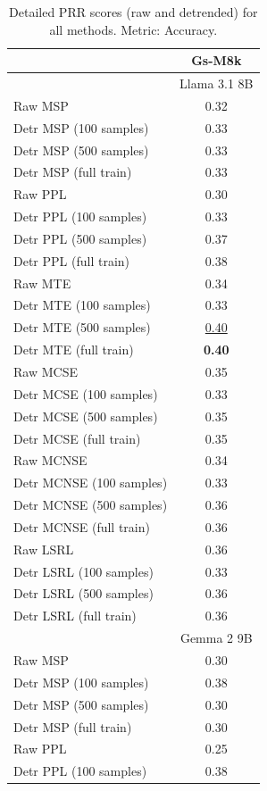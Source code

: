 \begin{table}
\footnotesize
\centering
\caption{Detailed PRR scores (raw and detrended) for all methods. Metric: Accuracy.}
\begin{tabular}{lc}
\toprule
&Gs-M8k\\
\midrule
& \multicolumn{8}{c}{Llama 3.1 8B}\\
\midrule
Raw MSP & 0.32 \\
Detr MSP (100 samples) & 0.33 \\
Detr MSP (500 samples) & 0.33 \\
Detr MSP (full train) & 0.33 \\
\midrule
Raw PPL & 0.30 \\
Detr PPL (100 samples) & 0.33 \\
Detr PPL (500 samples) & 0.37 \\
Detr PPL (full train) & 0.38 \\
\midrule
Raw MTE & 0.34 \\
Detr MTE (100 samples) & 0.33 \\
Detr MTE (500 samples) & \underline{0.40} \\
Detr MTE (full train) & \textbf{0.40} \\
\midrule
Raw MCSE & 0.35 \\
Detr MCSE (100 samples) & 0.33 \\
Detr MCSE (500 samples) & 0.35 \\
Detr MCSE (full train) & 0.35 \\
\midrule
Raw MCNSE & 0.34 \\
Detr MCNSE (100 samples) & 0.33 \\
Detr MCNSE (500 samples) & 0.36 \\
Detr MCNSE (full train) & 0.36 \\
\midrule
Raw LSRL & 0.36 \\
Detr LSRL (100 samples) & 0.33 \\
Detr LSRL (500 samples) & 0.36 \\
Detr LSRL (full train) & 0.36 \\
\midrule
\midrule
& \multicolumn{8}{c}{Gemma 2 9B}\\
\midrule
Raw MSP & 0.30 \\
Detr MSP (100 samples) & 0.38 \\
Detr MSP (500 samples) & 0.30 \\
Detr MSP (full train) & 0.30 \\
\midrule
Raw PPL & 0.25 \\
Detr PPL (100 samples) & 0.38 \\

\end{tabular}
\end{table}
